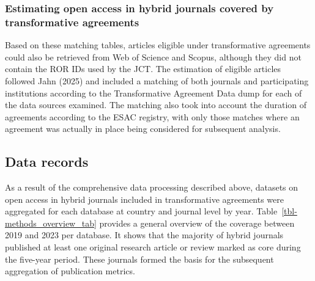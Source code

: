 \documentclass[a4paper,man,floatsintext,longtable,noextraspace,10pt]{apa6}
\begin{document}
\subsubsection{Estimating open access in hybrid journals covered by
transformative
agreements}\label{estimating-open-access-in-hybrid-journals-covered-by-transformative-agreements}

Based on these matching tables, articles eligible under transformative
agreements could also be retrieved from Web of Science and Scopus,
although they did not contain the ROR IDs used by the JCT. The
estimation of eligible articles followed Jahn (2025) and included a
matching of both journals and participating institutions according to
the Transformative Agreement Data dump for each of the data sources
examined. The matching also took into account the duration of agreements
according to the ESAC registry, with only those matches where an
agreement was actually in place being considered for subsequent
analysis.

\subsection{Data records}\label{data-records}

As a result of the comprehensive data processing described above,
datasets on open access in hybrid journals included in transformative
agreements were aggregated for each database at country and journal
level by year. Table~\ref{tbl-methods_overview_tab} provides a general
overview of the coverage between 2019 and 2023 per database. It shows
that the majority of hybrid journals published at least one original
research article or review marked as core during the five-year period.
These journals formed the basis for the subsequent aggregation of
publication metrics.
\end{document}
